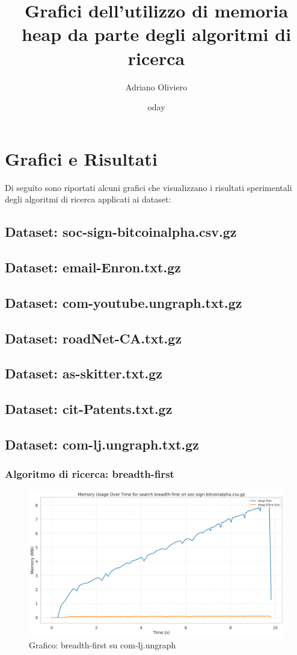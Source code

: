 \documentclass{article}
\title{Grafici dell'utilizzo di memoria heap da parte degli algoritmi di ricerca}
\author{Adriano Oliviero}
\date{	oday}
\begin{document}
\maketitle
\tableofcontents
\newpage
\section{Grafici e Risultati}
Di seguito sono riportati alcuni grafici che visualizzano i risultati sperimentali degli algoritmi di ricerca applicati ai dataset:
\subsection{Dataset: soc-sign-bitcoinalpha.csv.gz}
\subsection{Dataset: email-Enron.txt.gz}
\subsection{Dataset: com-youtube.ungraph.txt.gz}
\subsection{Dataset: roadNet-CA.txt.gz}
\subsection{Dataset: as-skitter.txt.gz}
\subsection{Dataset: cit-Patents.txt.gz}
\subsection{Dataset: com-lj.ungraph.txt.gz}
\subsubsection{Algoritmo di ricerca: breadth-first}
\begin{figure}[h]\centering
	\includegraphics[width=\textwidth]{../plots/soc-sign-bitcoinalpha.csv_breadth-first.png}
	\caption{Grafico: breadth-first su com-lj.ungraph}
\end{figure}
\end{document}
